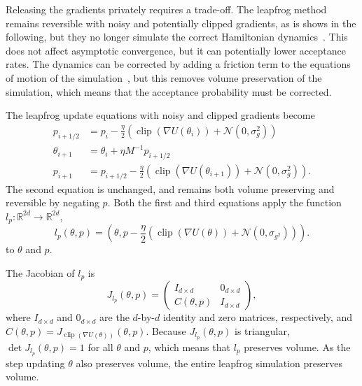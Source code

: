 \documentclass[english,twoside,openright]{HYgraduMLDS}
\newcommand{\R}{\mathbb{R}}
\newcommand{\caln}{{\mathcal{N}}}
\DeclareMathOperator{\clip}{clip}
\begin{document}
Releasing the gradients privately requires a trade-off. The leapfrog method remains
reversible with noisy and potentially clipped gradients, as is shows in the following,
but they no longer simulate the correct Hamiltonian dynamics~\cite{CFG14}. This does not affect
asymptotic convergence, but it can potentially lower acceptance rates.
The dynamics can be corrected by adding a friction term to the equations of
motion of the simulation~\cite{CFG14}, but this removes volume preservation of the simulation,
which means that the acceptance probability must be corrected.

The leapfrog update equations with noisy and clipped gradients become
\begin{align*}
  p_{i+1/2} &= p_{i} - \frac{\eta}{2}(\clip(\nabla U(\theta_{i})) + \caln(0, \sigma_{g}^{2})) \\
  \theta_{i+1} &= \theta_{i} + \eta M^{-1}p_{i+1/2} \\
  p_{i+1} &= p_{i+1/2} - \frac{\eta}{2}(\clip(\nabla U(\theta_{i+1})) + \caln(0, \sigma_{g}^{2})).
\end{align*}
The second equation is unchanged, and remains both volume preserving and reversible
by negating \(p\). Both the first and third equations apply the function
\(l_{p}\colon \R^{2d}\to \R^{2d}\),
\[
  l_{p}(\theta, p) = \left(\theta, p - \frac{\eta}{2}(\clip(\nabla U(\theta))
    + \caln(0, \sigma_{g^{2}}))\right).
\]
to \(\theta\) and \(p\).

The Jacobian of \(l_{p}\) is
\[
  J_{l_{p}}(\theta, p) =
  \begin{pmatrix}
    I_{d\times d} & 0_{d\times d} \\
    C(\theta, p) & I_{d\times d}
  \end{pmatrix},
\]
where \(I_{d\times d}\) and \(0_{d\times d}\) are the \(d\)-by-\(d\) identity and
zero matrices, respectively, and \(C(\theta, p) = J_{\clip(\nabla U(\theta))}(\theta, p)\).
Because \(J_{l_{p}}(\theta, p)\) is triangular, \(\det J_{l_{p}}(\theta, p) = 1\)
for all \(\theta\) and \(p\), which means that \(l_{p}\) preserves volume.
As the step updating \(\theta\) also preserves volume, the entire leapfrog
simulation preserves volume.
\end{document}
